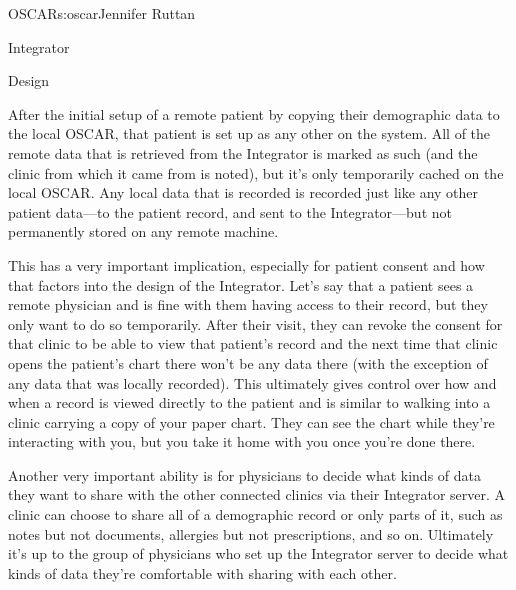\begin{aosachapter}{OSCAR}{s:oscar}{Jennifer Ruttan}
\begin{aosasect1}{Integrator}
\begin{aosasect2}{Design}

After the initial setup of a remote patient by copying their
demographic data to the local OSCAR, that patient is set up as any other
on the system. All of the remote data that is retrieved from the
Integrator is marked as such (and the clinic from which it came from
is noted), but it's only temporarily cached on the local OSCAR. Any
local data that is recorded is recorded just like any other patient
data---to the patient record, and sent to the Integrator---but not
permanently stored on any remote machine.


This has a very important implication, especially for patient consent
and how that factors into the design of the Integrator. Let's say that
a patient sees a remote physician and is fine with them having access
to their record, but they only want to do so temporarily. After their
visit, they can revoke the consent for that clinic to be able to view
that patient's record and the next time that clinic opens the
patient's chart there won't be any data there (with the exception of
any data that was locally recorded). This ultimately gives control
over how and when a record is viewed directly to the patient and is
similar to walking into a clinic carrying a copy of your paper
chart. They can see the chart while they're interacting with you, but
you take it home with you once you're done there.


Another very important ability is for physicians to decide what kinds
of data they want to share with the other connected clinics via their
Integrator server. A clinic can choose to share all of a demographic
record or only parts of it, such as notes but not documents, allergies
but not prescriptions, and so on. Ultimately it's up to the group of
physicians who set up the Integrator server to decide what kinds of
data they're comfortable with sharing with each other.


\end{aosasect2}
\end{aosasect1}
\end{aosachapter}
